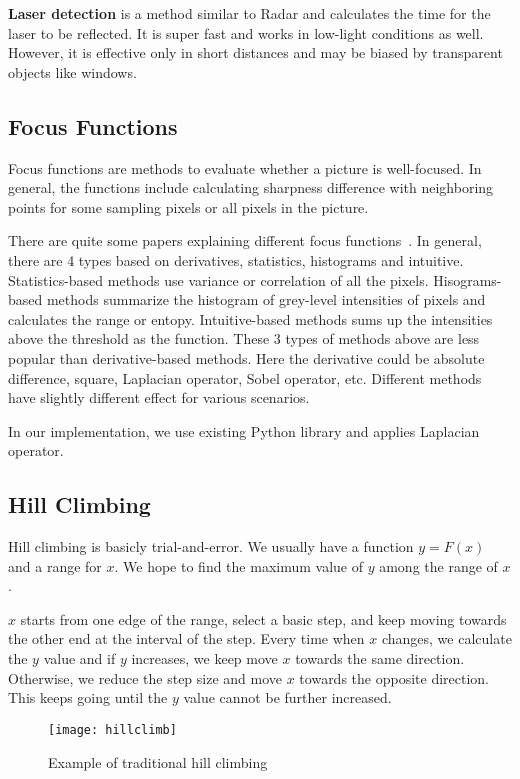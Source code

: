 \textbf{Laser detection} is a method similar to Radar and calculates the time for the laser to be reflected.
It is super fast and works in low-light conditions as well.
However, it is effective only in short distances and may be biased by transparent objects like windows.

\subsection{Focus Functions}

Focus functions are methods to evaluate whether a picture is well-focused.
In general, the functions include calculating sharpness difference with neighboring points for some sampling pixels or all pixels in the picture.

There are quite some papers explaining different focus functions~\cite{focusfunction}.
In general, there are 4 types based on derivatives, statistics, histograms and intuitive.
Statistics-based methods use variance or correlation of all the pixels.
Hisograms-based methods summarize the histogram of grey-level intensities of pixels and calculates the range or entopy.
Intuitive-based methods sums up the intensities above the threshold as the function.
These 3 types of methods above are less popular than derivative-based methods.
Here the derivative could be absolute difference, square, Laplacian operator, Sobel operator, etc.
Different methods have slightly different effect for various scenarios.

In our implementation, we use existing Python library and applies Laplacian operator.

\subsection{Hill Climbing}

Hill climbing is basicly trial-and-error.
We usually have a function $y=F(x)$ and a range for $x$.
We hope to find the maximum value of $y$ among the range of $x$.

$x$ starts from one edge of the range, select a basic step, and keep moving towards the other end at the interval of the step.
Every time when $x$ changes, we calculate the $y$ value and if $y$ increases, we keep move $x$ towards the same direction.
Otherwise, we reduce the step size and move $x$ towards the opposite direction.
This keeps going until the $y$ value cannot be further increased.

\begin{figure}[tb!]
	\begin{center}
		\texttt{[image: hillclimb]}
	\end{center}
	\caption{Example of traditional hill climbing}
	\label{f:hillclimb}
\end{figure}

